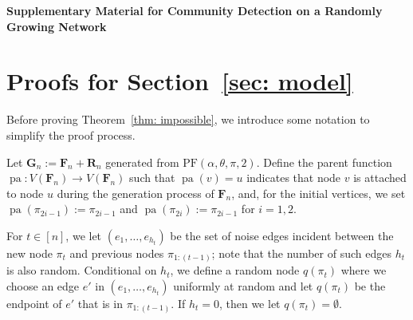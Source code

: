 \documentclass[twoside,11pt]{article}
\theoremstyle{remark}
\begin{document}
%


%




\newpage

\clearpage

\appendix

\begingroup
\centering
{\LARGE\bf Supplementary Material for Community Detection on a Randomly Growing Network\par}
\par
\endgroup

\vspace{1em}


\section{Proofs for Section~\ref{sec: model}}
\label{sec: appendix model}
Before proving Theorem~\ref{thm: impossible}, we introduce some notation to simplify the proof process. 

Let $\boldsymbol{G}_{n}:=\bm{F}_n+\bm{R}_n$ generated from $\mathrm{PF}(\alpha, \theta, \pi, 2)$.
Define the parent function $\operatorname{pa}: V(\boldsymbol{F}_{n}) \to V(\boldsymbol{F}_{n})$ such that $\operatorname{pa}(v) = u$ indicates that node $v$ is attached to node $u$ during the generation process of $\boldsymbol{F}_{n}$, and, for the initial vertices, we set $\operatorname{pa}(\pi_{2i-1}):=\pi_{2i-1}$ and $\operatorname{pa}(\pi_{2i}):=\pi_{2i-1}$ for $i=1,2$.

For $t \in [n]$, we let $(e_1, \ldots, e_{h_t})$ be the set of noise edges incident between the new node $\pi_t$ and previous nodes $\pi_{1:(t-1)}$; note that the number of such edges $h_t$ is also random. Conditional on $h_t$, we define a random node $q(\pi_t)$ where we choose an edge $e'$ in $(e_1, \ldots, e_{h_t})$ uniformly at random and let $q(\pi_t)$ be the endpoint of $e'$ that is in $\pi_{1:(t-1)}$. If $h_t = 0$, then we let $q(\pi_t) = \emptyset$. 


\end{document}
